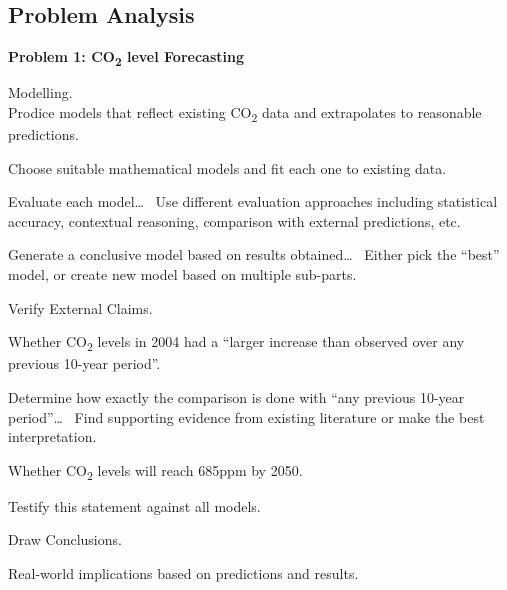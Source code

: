 \documentclass{mcmthesis}
\begin{document}
    \subsection{Problem Analysis}
    \noindent\textbf{Problem 1: CO\textsubscript{2} level Forecasting}

    \begin{adjustwidth}{1cm}{}

        \noindent Modelling. \\
        \vspace{-6pt}
        \noindent Prodice models that reflect existing CO\textsubscript{2} data and extrapolates to reasonable predictions.

        \begin{adjustwidth}{1cm}{}
            \noindent Choose suitable mathematical models and fit each one to existing data.

            \noindent Evaluate each model\ldots~
            Use different evaluation approaches including statistical accuracy, contextual reasoning, comparison with external predictions, etc.

            \noindent Generate a conclusive model based on results obtained\ldots~
            Either pick the ``best'' model, or create new model based on multiple sub-parts.
        \end{adjustwidth}

        \noindent Verify External Claims.

        \begin{adjustwidth}{1cm}{}
            \noindent Whether CO\textsubscript{2} levels in 2004 had a ``larger increase than observed over any previous 10-year period''.

            \begin{adjustwidth}{1cm}{}
                \noindent Determine how exactly the comparison is done with ``any previous 10-year period''\ldots~
                Find supporting evidence from existing literature or make the best interpretation.
            \end{adjustwidth}

            \noindent Whether CO\textsubscript{2} levels will reach 685ppm by 2050.

            \begin{adjustwidth}{1cm}{}
                \noindent Testify this statement against all models.
            \end{adjustwidth}

        \end{adjustwidth}

        \noindent Draw Conclusions.

        \vspace{-6pt}
        Real-world implications based on predictions and results.

    \end{adjustwidth}
\end{document}
